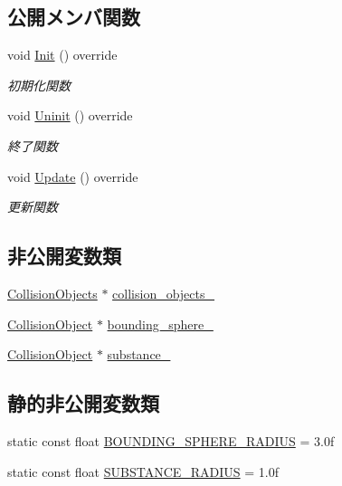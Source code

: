 \subsection*{公開メンバ関数}
\begin{DoxyCompactItemize}
\item 
void \mbox{\hyperlink{class_enemy_collision_ae5c000a30c8c4a023dd0c8e658def772}{Init}} () override
\begin{DoxyCompactList}\small\item\em 初期化関数 \end{DoxyCompactList}\item 
void \mbox{\hyperlink{class_enemy_collision_a2a194c606fd162db803c70c6fed9b9e4}{Uninit}} () override
\begin{DoxyCompactList}\small\item\em 終了関数 \end{DoxyCompactList}\item 
void \mbox{\hyperlink{class_enemy_collision_ab54133504d867c6d2070d2f3854a0aaf}{Update}} () override
\begin{DoxyCompactList}\small\item\em 更新関数 \end{DoxyCompactList}\end{DoxyCompactItemize}
\subsection*{非公開変数類}
\begin{DoxyCompactItemize}
\item 
\mbox{\hyperlink{class_collision_objects}{Collision\+Objects}} $\ast$ \mbox{\hyperlink{class_enemy_collision_a8d3eac14a182985164d52a8fb385bd78}{collision\+\_\+objects\+\_\+}}
\item 
\mbox{\hyperlink{class_collision_object}{Collision\+Object}} $\ast$ \mbox{\hyperlink{class_enemy_collision_a065309bed90f1b2e3539cb9859bc06ef}{bounding\+\_\+sphere\+\_\+}}
\item 
\mbox{\hyperlink{class_collision_object}{Collision\+Object}} $\ast$ \mbox{\hyperlink{class_enemy_collision_aa772f240ff6bb9d9cb4c6c2095b79b32}{substance\+\_\+}}
\end{DoxyCompactItemize}
\subsection*{静的非公開変数類}
\begin{DoxyCompactItemize}
\item 
static const float \mbox{\hyperlink{class_enemy_collision_abb5e13f2f882e313baf784f04f5b465d}{B\+O\+U\+N\+D\+I\+N\+G\+\_\+\+S\+P\+H\+E\+R\+E\+\_\+\+R\+A\+D\+I\+US}} = 3.\+0f
\item 
static const float \mbox{\hyperlink{class_enemy_collision_ab794511516a743fdd9d8f7b00ab6a967}{S\+U\+B\+S\+T\+A\+N\+C\+E\+\_\+\+R\+A\+D\+I\+US}} = 1.\+0f
\end{DoxyCompactItemize}


